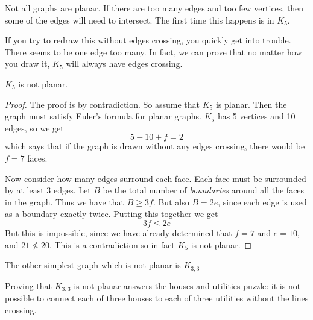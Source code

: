 \documentclass[12pt]{article}
\begin{document}
Not all graphs are planar.  If there are too many edges and too few vertices, then some of the edges will need to intersect.  The first time this happens is in $K_5$.

\begin{center}
\end{center}

If you try to redraw this without edges crossing, you quickly get into trouble.  There seems to be one edge too many.  In fact, we can prove that no matter how you draw it, $K_5$ will always have edges crossing.

\begin{theorem}
  $K_5$ is not planar.
\end{theorem}

\begin{proof}
  The proof is by contradiction.  So assume that $K_5$ is planar.  Then the graph must satisfy Euler's formula for planar graphs.  $K_5$ has 5 vertices and 10 edges, so we get 
  \[5 - 10 + f = 2\]
  which says that if the graph is drawn without any edges crossing, there would be $f = 7$ faces.
  
  Now consider how many edges surround each face.  Each face must be surrounded by at least 3 edges.  Let $B$ be the total number of {\em boundaries} around all the faces in the graph.  Thus we have that $B \ge 3f$.  But also $B = 2e$, since each edge is used as a boundary exactly twice.  Putting this together we get
  \[3f \le 2e\]
  But this is impossible, since we have already determined that $f = 7$ and $e = 10$, and $21 \not\le 20$.  This is a contradiction so in fact $K_5$ is not planar.
\end{proof}

The other simplest graph which is not planar is $K_{3,3}$
    \begin{center}
    \end{center}
    
Proving that $K_{3,3}$ is not planar answers the houses and utilities puzzle: it is not possible to connect each of three houses to each of three utilities without the lines crossing.
\end{document}
